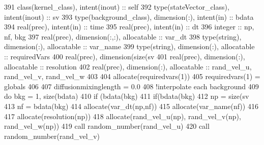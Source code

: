 \begin{DoxyCode}
391     \textcolor{keywordtype}{class}(kernel\_class), \textcolor{keywordtype}{intent(inout)} :: self
392     \textcolor{keywordtype}{type}(stateVector\_class), \textcolor{keywordtype}{intent(inout)} :: sv
393     \textcolor{keywordtype}{type}(background\_class), \textcolor{keywordtype}{dimension(:)}, \textcolor{keywordtype}{intent(in)} :: bdata
394     \textcolor{keywordtype}{real(prec)}, \textcolor{keywordtype}{intent(in)} :: time
395     \textcolor{keywordtype}{real(prec)}, \textcolor{keywordtype}{intent(in)} :: dt
396     \textcolor{keywordtype}{integer} :: np, nf, bkg
397     \textcolor{keywordtype}{real(prec)}, \textcolor{keywordtype}{dimension(:,:)}, \textcolor{keywordtype}{allocatable} :: var\_dt
398     \textcolor{keywordtype}{type}(string), \textcolor{keywordtype}{dimension(:)}, \textcolor{keywordtype}{allocatable} :: var\_name
399     \textcolor{keywordtype}{type}(string), \textcolor{keywordtype}{dimension(:)}, \textcolor{keywordtype}{allocatable} :: requiredVars
400     \textcolor{keywordtype}{real(prec)}, \textcolor{keywordtype}{dimension(size(sv%
401     \textcolor{keywordtype}{real(prec)}, \textcolor{keywordtype}{dimension(:)}, \textcolor{keywordtype}{allocatable} :: resolution
402     \textcolor{keywordtype}{real(prec)}, \textcolor{keywordtype}{dimension(:)}, \textcolor{keywordtype}{allocatable} :: rand\_vel\_u, rand\_vel\_v, rand\_vel\_w
403 
404     \textcolor{keyword}{allocate}(requiredvars(1))
405     requiredvars(1) = globals%
406 
407     diffusionmixinglength = 0.0
408     \textcolor{comment}{!interpolate each background}
409     \textcolor{keywordflow}{do} bkg = 1, \textcolor{keyword}{size}(bdata)
410         \textcolor{keywordflow}{if} (bdata(bkg)%
411             \textcolor{keywordflow}{if}(bdata(bkg)%
412                 np = \textcolor{keyword}{size}(sv%
413                 nf = bdata(bkg)%
414                 \textcolor{keyword}{allocate}(var\_dt(np,nf))
415                 \textcolor{keyword}{allocate}(var\_name(nf))
416 
417                 \textcolor{keyword}{allocate}(resolution(np))
418                 \textcolor{keyword}{allocate}(rand\_vel\_u(np), rand\_vel\_v(np), rand\_vel\_w(np))
419                 \textcolor{keyword}{call }random\_number(rand\_vel\_u)
420                 \textcolor{keyword}{call }random\_number(rand\_vel\_v)
}
\end{DoxyCode}
